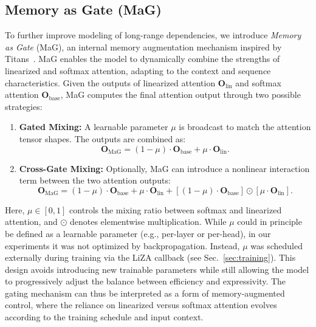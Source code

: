 \documentclass[10pt,a4paper]{article}
\begin{document}
\subsection{Memory as Gate (MaG)}
To further improve modeling of long-range dependencies, we introduce \textit{Memory as Gate} (MaG), an internal memory augmentation mechanism inspired by Titans~\cite{behrouz2024titans}. MaG enables the model to dynamically combine the strengths of linearized and softmax attention, adapting to the context and sequence characteristics. Given the outputs of linearized attention $\mathbf{O}_{\text{lin}}$ and softmax attention $\mathbf{O}_{\text{base}}$, MaG computes the final attention output through two possible strategies:
\begin{enumerate}
    \item \textbf{Gated Mixing:} A learnable parameter $\mu$ is broadcast to match the attention tensor shapes. The outputs are combined as:
    \begin{equation}
        \mathbf{O}_{\text{MaG}} = (1-\mu) \cdot \mathbf{O}_{\text{base}} + \mu \cdot \mathbf{O}_{\text{lin}} .
    \end{equation}
    \item \textbf{Cross-Gate Mixing:} Optionally, MaG can introduce a nonlinear interaction term between the two attention outputs:
    \begin{equation}
        \mathbf{O}_{\text{MaG}} = (1-\mu) \cdot \mathbf{O}_{\text{base}} + \mu \cdot \mathbf{O}_{\text{lin}} + \left[(1-\mu) \cdot \mathbf{O}_{\text{base}}\right] \odot \left[\mu \cdot \mathbf{O}_{\text{lin}}\right] .
    \end{equation}
\end{enumerate}

Here, $\mu \in [0,1]$ controls the mixing ratio between softmax and linearized attention, and $\odot$ denotes elementwise multiplication. While $\mu$ could in principle be defined as a learnable parameter (e.g., per-layer or per-head), in our experiments it was not optimized by backpropagation. Instead, $\mu$ was scheduled externally during training via the LiZA callback (see Sec.~\ref{sec:training}). This design avoids introducing new trainable parameters while still allowing the model to progressively adjust the balance between efficiency and expressivity. The gating mechanism can thus be interpreted as a form of memory-augmented control, where the reliance on linearized versus softmax attention evolves according to the training schedule and input context.
\end{document}
